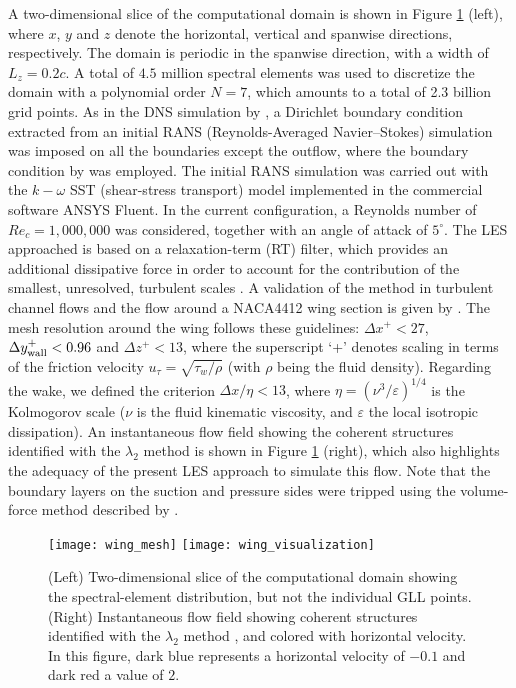 A two-dimensional slice of the computational domain is shown in Figure \ref{flow_field} (left), where $x$, $y$ and $z$ denote the horizontal, vertical and spanwise directions, respectively. The domain is periodic in the spanwise direction, with a width of $L_{z}=0.2c$. A total of $4.5$ million spectral elements was used to discretize the domain with a polynomial order $N=7$, which amounts to a total of 2.3 billion grid points. As in the DNS simulation by \cite{hosseini_et_al}, a Dirichlet boundary condition extracted from an initial RANS (Reynolds-Averaged Navier--Stokes) simulation was imposed on all the boundaries except the outflow, where the boundary condition by \cite{dong2014} was employed. The initial RANS simulation was carried out with the $k-\omega$ SST (shear-stress transport) model \citep{menter} implemented in the commercial software ANSYS Fluent. In the current configuration, a Reynolds number of $Re_{c}=1,000,000$ was considered, together with an angle of attack of $5^{\circ}$. The LES approached is based on a relaxation-term (RT) filter, which provides an additional dissipative force in order to account for the contribution of the smallest, unresolved, turbulent scales \citep{schlatter_et_al_2004}. A validation of the method in turbulent channel flows and the flow around a NACA4412 wing section is given by \cite{negi_et_al}.  The mesh resolution around the wing follows these guidelines: $\Delta x^{+} < 27$, $\Delta y^{+}_{{\rm wall}} < 0.96$ and $\Delta z^{+} < 13$, where the superscript `+' denotes scaling in terms of the friction velocity $u_{\tau}=\sqrt{\tau_{w} / \rho}$ (with $\rho$ being the fluid density). Regarding the wake, we defined the criterion $\Delta x / \eta < 13$, where $\eta=\left ( \nu^{3} / \varepsilon \right )^{1/4}$ is the Kolmogorov scale ($\nu$ is the fluid kinematic viscosity, and $\varepsilon$ the local isotropic dissipation). An instantaneous flow field showing the coherent structures identified with the $\lambda_{2}$ method \citep{jeong95} is shown in Figure \ref{flow_field} (right), which also highlights the adequacy of the present LES approach to simulate this flow. Note that the boundary layers on the suction and pressure sides were tripped using the volume-force method described by \cite{schlatter_orlu12}.
\begin{figure}[t]
\centering
\texttt{[image: wing\_mesh]}
\texttt{[image: wing\_visualization]}
\caption{(Left) Two-dimensional slice of the computational domain showing the spectral-element distribution, but not the individual GLL points. (Right) Instantaneous flow field showing coherent structures identified with the $\lambda_{2}$ method \citep{jeong95}, and colored with horizontal velocity. In this figure, dark blue represents a horizontal velocity of $-0.1$ and dark red a value of $2$.}
\label{flow_field}
\end{figure}

